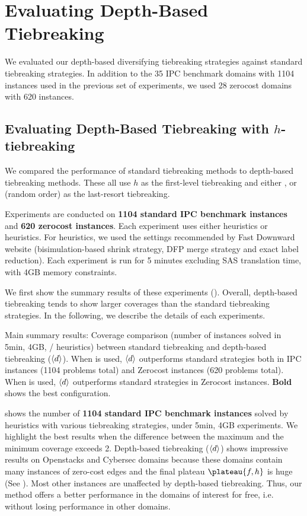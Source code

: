 \section{Evaluating Depth-Based Tiebreaking}
\label{sec:depth-based-evaluation}
We evaluated our depth-based diversifying tiebreaking strategies against standard
tiebreaking strategies.
In addition to the 35 IPC benchmark domains with 1104 instances used in
the previous set of experiments, we used 28 zerocost domains with 620
instances.

\subsection{Evaluating Depth-Based Tiebreaking with $h$-tiebreaking}

We compared the performance of standard tiebreaking methods to
depth-based tiebreaking methods. These all use $h$ as the first-level
tiebreaking and either \fifo, \lifo or \ro (random order) as the
last-resort tiebreaking.

Experiments are conducted on \textbf{1104 standard IPC benchmark
instances} and \textbf{620 zerocost instances}.  Each experiment uses
either \lmcut heuristics or \mands heuristics.  For \mands heuristics,
we used the settings recommended by Fast Downward website
(bisimulation-based shrink strategy, DFP merge strategy and exact label
reduction). Each experiment is run for 5 minutes excluding SAS
translation time, with 4GB memory constraints.

We first show the summary results of these experiments ().
Overall, depth-based tiebreaking tends to show larger coverages than the
standard tiebreaking strategies. 
In the following, we describe the
details of each experiments.

\begin{table}[htb]
 {
 \centering
 \setlength{\tabcolsep}{3pt}
 
 \caption{
 Main summary results: Coverage comparison (number of instances solved in 5min, 4GB, \lmcut/\mands
 heuristics) between standard tiebreaking and depth-based tiebreaking
 (${\left<d\right>}$). When \lmcut is used, ${\left<d\right>}$ outperforms standard strategies both in IPC
 instances (1104 problems total) and Zerocost instances (620 problems
 total). When \mands is used, ${\left<d\right>}$ outperforms standard strategies
 in Zerocost instances. \textbf{Bold} shows the best configuration.}
 \label{tbl:depth-summary}
 }
\end{table}

 shows the number of \textbf{1104 standard
IPC benchmark instances} solved by \lmcut heuristics with various
tiebreaking strategies, under 5min, 4GB experiments. We highlight the
best results when the difference between the maximum and the minimum
coverage exceeds 2.  Depth-based tiebreaking (${\left<d\right>}$) shows
impressive results on Openstacks and Cybersec domains because these
domains contain many instances of zero-cost edges and the final plateau
$\plateau{f,h}$ is huge (See ).  Most other instances
are unaffected by depth-based tiebreaking.  Thus, our method offers a
better performance in the domains of interest for free, i.e. without
losing performance in other domains.


